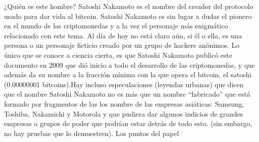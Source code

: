 \documentclass[a4paper,12pt]{lib/pub}
\begin{document}
¿Quién es este hombre? Satoshi Nakamoto es el nombre del creador del protocolo usado para dar vida al bitcoin. Satoshi Nakamoto es sin lugar a dudas el pionero en el mundo de las criptomonedas y a la vez el personaje más enigmático relacionado con este tema. Al día de hoy no está claro aún, si él o ella, es una persona o un personaje ficticio creado por un grupo de hackers anónimos. Lo único que se conoce a ciencia cierta, es que Satoshi Nakamoto publicó este documento en 2009 que dió inicio a todo el desarrollo de las criptomonedas, y que además da su nombre a la fracción mínima con la que opera el bitcoin, el satoshi (0.00000001 bitcoins).Hay incluso especulaciones (leyendas urbanas) que dicen que el nombre Satoshi Nakamoto no es más que un nombre “fabricado” que está formado por fragmentos de las los nombre de las empresas asiáticas: Samsung, Toshiba, Nakamichi y Motorola y que pudiera dar algunos indicios de grandes empresas o grupos de poder que podrían estar detrás de todo esto. (sin embargo, no hay pruebas que lo demuestren). Los puntos del papel
\end{document}
